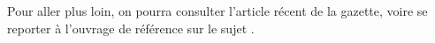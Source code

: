 \documentclass[a4paper,12pt]{article}
\begin{document}
Pour aller plus loin, on pourra consulter l'article récent \cite{FrankPrivat} de la gazette,
voire se reporter à l'ouvrage de référence sur le sujet \cite{SuttonBarto}.
% 
% 
% 
% 
% 
% 
% 
% 
% 
% 
% 
% 
\end{document}
